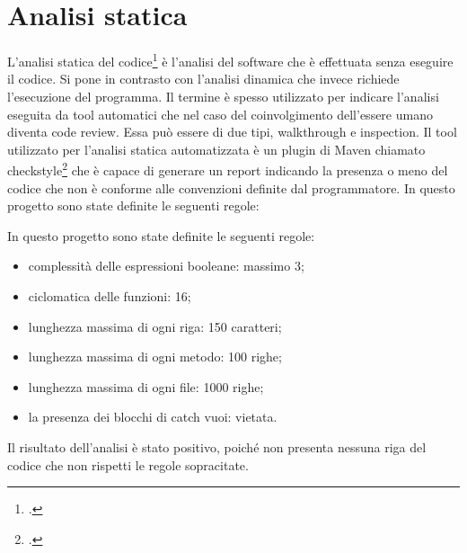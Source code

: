 \section{Analisi statica}\label{sec:analisi-statica}

L’analisi statica del codice\footcite{site:analisi_static} è l’analisi del software che è effettuata senza eseguire
il codice.
Si pone in contrasto con l’analisi dinamica che invece richiede l’esecuzione del
programma.
Il termine è spesso utilizzato per indicare l’analisi eseguita da tool
automatici che nel caso del coinvolgimento dell’essere umano diventa code review.
Essa può  essere di due tipi, \gls{walkthrough} e \gls{inspection}.
Il tool utilizzato per l’analisi statica automatizzata è un plugin di Maven
chiamato checkstyle\footcite{site:checkstyle} che è capace di generare un report indicando la presenza o
meno del codice che non è conforme alle convenzioni definite dal programmatore.
In questo progetto sono state definite le seguenti regole:

In questo progetto sono state definite le seguenti regole:
\begin{itemize}
    \item complessità delle espressioni booleane: massimo 3;
    \item \gls{ciclomatica} delle funzioni: 16;
    \item lunghezza massima di ogni riga: 150 caratteri;
    \item lunghezza massima di ogni metodo: 100 righe;
    \item lunghezza massima di ogni file: 1000 righe;
    \item la presenza dei blocchi di catch vuoi: vietata.
\end{itemize}

Il risultato dell'analisi è stato positivo, poiché non presenta nessuna riga del codice che non rispetti le regole sopracitate.